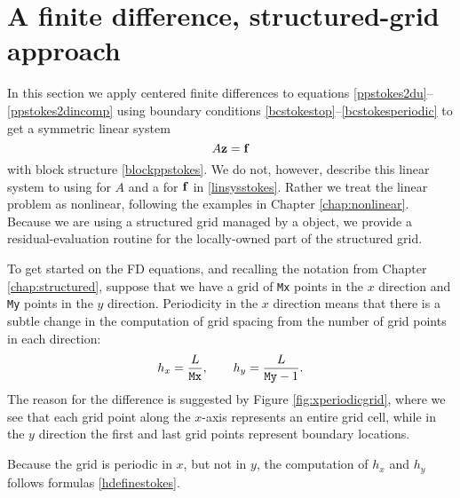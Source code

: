 \section{A finite difference, structured-grid approach}

In this section we apply centered finite differences to equations \eqref{ppstokes2du}--\eqref{ppstokes2dincomp} using boundary conditions \eqref{bcstokestop}--\eqref{bcstokesperiodic} to get a symmetric linear system
\begin{equation}
  A \mathbf{z} = \mathbf{f} \label{linsysstokes}
\end{equation}
with block structure \eqref{blockppstokes}.  We do not, however, describe this linear system to \PETSc using \pMat for $A$ and a \pVec for $\mathbf{f}$ in \eqref{linsysstokes}.  Rather we treat the linear problem as nonlinear, following the examples in Chapter \ref{chap:nonlinear}.  Because we are using a structured grid managed by a \PETSc \pDMDA object, we provide a residual-evaluation routine for the locally-owned part of the structured grid.

To get started on the FD equations, and recalling the notation from Chapter \ref{chap:structured}, suppose that we have a grid of \texttt{Mx} points in the $x$ direction and \texttt{My} points in the $y$ direction.  Periodicity in the $x$ direction means that there is a subtle change in the computation of grid spacing from the number of grid points in each direction:
\begin{equation}
h_x = \frac{L}{\text{\texttt{Mx}}}, \qquad h_y = \frac{L}{\text{\texttt{My}}-1}. \label{hdefinestokes}
\end{equation}
The reason for the difference is suggested by Figure \ref{fig:xperiodicgrid}, where we see that each grid point along the $x$-axis represents an entire grid cell, while in the $y$ direction the first and last grid points represent boundary locations.

\begin{marginfigure}
\caption{Because the grid is periodic in $x$, but not in $y$, the computation of $h_x$ and $h_y$ follows formulas \eqref{hdefinestokes}.}
\label{fig:xperiodicgrid}
\end{marginfigure}

